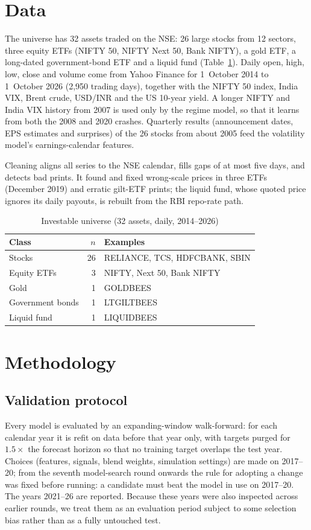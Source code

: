 \documentclass[conference]{IEEEtran}
\begin{document}
\section{Data}
The universe has 32 assets traded on the NSE: 26 large stocks from 12 sectors, three equity ETFs (NIFTY 50, NIFTY Next 50, Bank NIFTY), a gold ETF, a long-dated government-bond ETF and a liquid fund (Table~\ref{tab:data}). Daily open, high, low, close and volume come from Yahoo Finance for 1~October 2014 to 1~October 2026 (2,950 trading days), together with the NIFTY 50 index, India VIX, Brent crude, USD/INR and the US 10-year yield. A longer NIFTY and India VIX history from 2007 is used only by the regime model, so that it learns from both the 2008 and 2020 crashes. Quarterly results (announcement dates, EPS estimates and surprises) of the 26 stocks from about 2005 feed the volatility model's earnings-calendar features.

Cleaning aligns all series to the NSE calendar, fills gaps of at most five days, and detects bad prints. It found and fixed wrong-scale prices in three ETFs (December 2019) and erratic gilt-ETF prints; the liquid fund, whose quoted price ignores its daily payouts, is rebuilt from the RBI repo-rate path.

\begin{table}[t]
\caption{Investable universe (32 assets, daily, 2014--2026)}
\label{tab:data}
\centering
\begin{tabular}{@{}lrl@{}}
\toprule
Class & $n$ & Examples \\
\midrule
Stocks & 26 & RELIANCE, TCS, HDFCBANK, SBIN \\
Equity ETFs & 3 & NIFTY, Next 50, Bank NIFTY \\
Gold & 1 & GOLDBEES \\
Government bonds & 1 & LTGILTBEES \\
Liquid fund & 1 & LIQUIDBEES \\
\bottomrule
\end{tabular}
\end{table}

\section{Methodology}

\subsection{Validation protocol}
Every model is evaluated by an expanding-window walk-forward: for each calendar year it is refit on data before that year only, with targets purged for $1.5\times$ the forecast horizon so that no training target overlaps the test year. Choices (features, signals, blend weights, simulation settings) are made on 2017--20; from the seventh model-search round onwards the rule for adopting a change was fixed before running: a candidate must beat the model in use on 2017--20. The years 2021--26 are reported. Because these years were also inspected across earlier rounds, we treat them as an evaluation period subject to some selection bias rather than as a fully untouched test.
\end{document}
